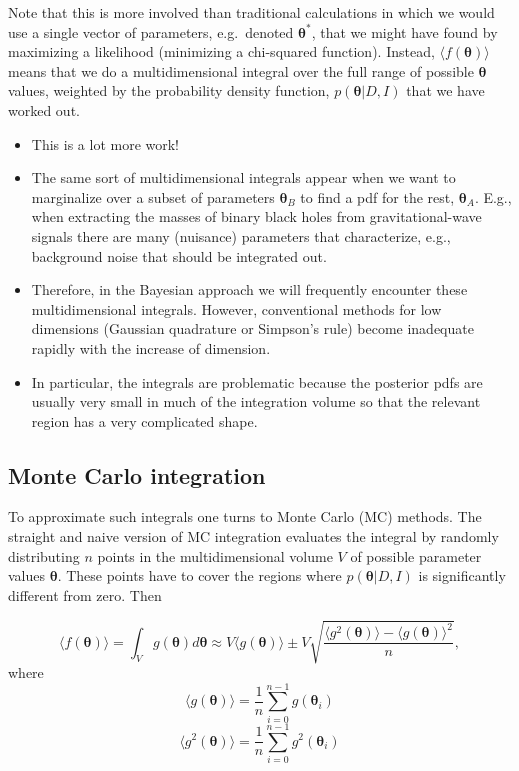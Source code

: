 \documentclass[%
oneside,                 %
final,                   %
10pt]{article}
\begin{document}
Note that this is more involved than traditional calculations in which we would use a single vector of parameters, e.g.~denoted $\boldsymbol{\theta}^*$, that we might have found by maximizing a likelihood (minimizing a chi-squared function). Instead, $\langle f( \boldsymbol{\theta} ) \rangle$ means that we do a multidimensional integral over the full range of possible $\boldsymbol{\theta}$ values, weighted by the probability density function, $p(\boldsymbol{\theta} |D,I)$ that we have worked out.

\begin{itemize}
\item This is a lot more work!

\item The same sort of multidimensional integrals appear when we want to marginalize over a subset of parameters $\boldsymbol{\theta}_B$ to find a pdf for the rest, $\boldsymbol{\theta}_A$. E.g., when extracting the masses of binary black holes from gravitational-wave signals there are many (nuisance) parameters that characterize, e.g.,   background noise that should be integrated out.

\item Therefore, in the Bayesian approach we will frequently encounter these multidimensional integrals. However, conventional methods for low dimensions (Gaussian quadrature or Simpson's rule) become inadequate rapidly with the increase of dimension.

\item In particular, the integrals are problematic because the posterior pdfs are usually very small in much of the integration volume so that the relevant region has a very complicated shape.
\end{itemize}

\noindent
\subsection{Monte Carlo integration}
To approximate such integrals one turns to Monte Carlo (MC) methods. The straight and naive version of MC integration evaluates the integral by randomly distributing $n$ points in the multidimensional volume $V$ of possible parameter values $\boldsymbol{\theta}$. These points have to cover the regions where $p( \boldsymbol{\theta} |D,I)$ is significantly different from zero. Then

\[
\langle f( \boldsymbol{\theta} ) \rangle = \int_V g( \boldsymbol{\theta} ) d\boldsymbol{\theta} \approx V \langle g( \boldsymbol{\theta} ) \rangle 
\pm V \sqrt{ \frac{\langle g^2( \boldsymbol{\theta} ) \rangle - \langle g( \boldsymbol{\theta} ) \rangle^2 }{n} },
\]
where
\[
\langle g( \boldsymbol{\theta} ) \rangle = \frac{1}{n} \sum_{i=0}^{n-1} g(\boldsymbol{\theta}_i )
\]
\[
\langle g^2( \boldsymbol{\theta} ) \rangle = \frac{1}{n} \sum_{i=0}^{n-1} g^2(\boldsymbol{\theta}_i )
\]
\end{document}
